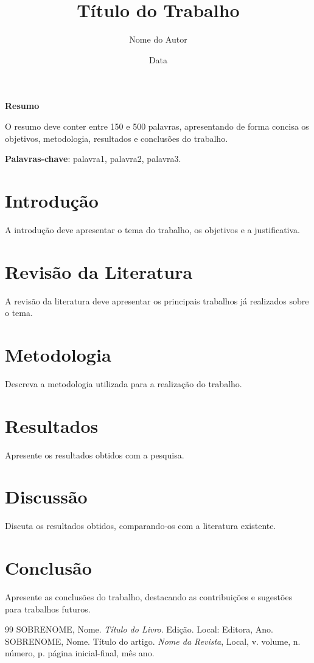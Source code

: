 \documentclass[a4paper,12pt]{article}
\title{Título do Trabalho}
\author{Nome do Autor}
\date{Data}
\begin{document}
\maketitle
\thispagestyle{empty} %

\newpage
\begin{center}
    \textbf{Resumo}
\end{center}
\noindent O resumo deve conter entre 150 e 500 palavras, apresentando de forma concisa os objetivos, metodologia, resultados e conclusões do trabalho.

\begin{center}
    \textbf{Palavras-chave}: palavra1, palavra2, palavra3.
\end{center}

\newpage

\tableofcontents

\newpage

\section{Introdução}
A introdução deve apresentar o tema do trabalho, os objetivos e a justificativa.

\section{Revisão da Literatura}
A revisão da literatura deve apresentar os principais trabalhos já realizados sobre o tema.

\section{Metodologia}
Descreva a metodologia utilizada para a realização do trabalho.

\section{Resultados}
Apresente os resultados obtidos com a pesquisa.

\section{Discussão}
Discuta os resultados obtidos, comparando-os com a literatura existente.

\section{Conclusão}
Apresente as conclusões do trabalho, destacando as contribuições e sugestões para trabalhos futuros.

\newpage

\begin{thebibliography}{99}
 SOBRENOME, Nome. \textit{Título do Livro}. Edição. Local: Editora, Ano.
 SOBRENOME, Nome. Título do artigo. \textit{Nome da Revista}, Local, v. volume, n. número, p. página inicial-final, mês ano.
\end{thebibliography}
\end{document}

